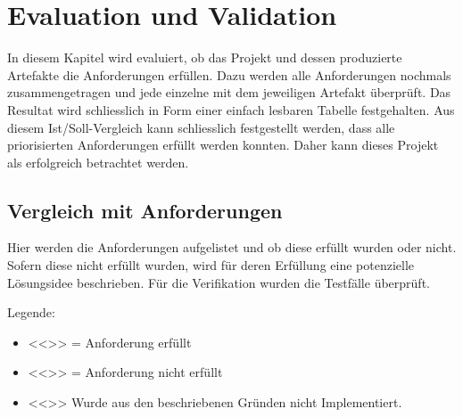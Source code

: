 \chapter{Evaluation und Validation}
\label{ch:Eval}
In diesem Kapitel wird evaluiert, ob das Projekt und dessen produzierte Artefakte die Anforderungen erfüllen. Dazu werden alle Anforderungen nochmals zusammengetragen und jede einzelne mit dem jeweiligen Artefakt überprüft. Das Resultat wird schliesslich in Form einer einfach lesbaren Tabelle festgehalten. Aus diesem Ist/Soll-Vergleich kann schliesslich festgestellt werden, dass alle priorisierten Anforderungen erfüllt werden konnten. Daher kann dieses Projekt als erfolgreich betrachtet werden.

\section{Vergleich mit Anforderungen}
\label{sec:VergleichAnforderungen}
Hier werden die Anforderungen aufgelistet und ob diese erfüllt wurden oder nicht. Sofern diese nicht erfüllt wurden, wird für deren Erfüllung eine potenzielle Lösungsidee beschrieben. Für die Verifikation wurden die Testfälle überprüft.

Legende:
\begin{itemize}[label={}, noitemsep]
	\item <<\checkmark >> = Anforderung erfüllt
	\item <<\xmark>> = Anforderung nicht erfüllt
	\item <<\notmark>> Wurde aus den beschriebenen Gründen nicht Implementiert.
\end{itemize}


